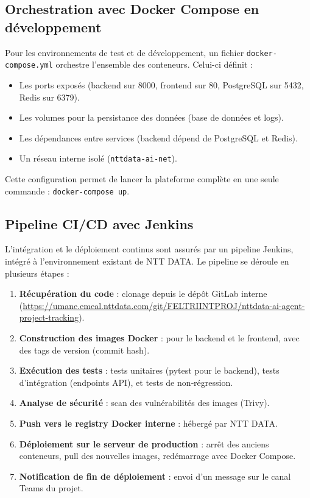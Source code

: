 \subsection{Orchestration avec Docker Compose en développement}
Pour les environnements de test et de développement, un fichier \texttt{docker-compose.yml} orchestre l’ensemble des conteneurs. Celui-ci définit :
\begin{itemize}
    \renewcommand{\labelitemi}{—}
    \item Les ports exposés (backend sur 8000, frontend sur 80, PostgreSQL sur 5432, Redis sur 6379).
    \item Les volumes pour la persistance des données (base de données et logs).
    \item Les dépendances entre services (backend dépend de PostgreSQL et Redis).
    \item Un réseau interne isolé (\texttt{nttdata-ai-net}).
\end{itemize}
Cette configuration permet de lancer la plateforme complète en une seule commande : \texttt{docker-compose up}.

\subsection{Pipeline CI/CD avec Jenkins}
L’intégration et le déploiement continus sont assurés par un pipeline Jenkins, intégré à l’environnement existant de NTT DATA. Le pipeline se déroule en plusieurs étapes :
\begin{enumerate}
    \item \textbf{Récupération du code} : clonage depuis le dépôt GitLab interne (\url{https://umane.emeal.nttdata.com/git/FELTRIINTPROJ/nttdata-ai-agent-project-tracking}).
    \item \textbf{Construction des images Docker} : pour le backend et le frontend, avec des tags de version (commit hash).
    \item \textbf{Exécution des tests} : tests unitaires (pytest pour le backend), tests d’intégration (endpoints API), et tests de non‑régression.
    \item \textbf{Analyse de sécurité} : scan des vulnérabilités des images (Trivy).
    \item \textbf{Push vers le registry Docker interne} : hébergé par NTT DATA.
    \item \textbf{Déploiement sur le serveur de production} : arrêt des anciens conteneurs, pull des nouvelles images, redémarrage avec Docker Compose.
    \item \textbf{Notification de fin de déploiement} : envoi d’un message sur le canal Teams du projet.
\end{enumerate}


